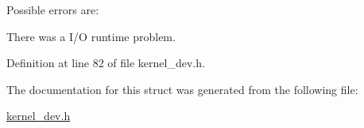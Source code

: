 Possible errors are\+:
\begin{DoxyItemize}
\item There was a I/O runtime problem. 
\end{DoxyItemize}

Definition at line 82 of file kernel\+\_\+dev.\+h.



The documentation for this struct was generated from the following file\+:\begin{DoxyCompactItemize}
\item 
\hyperlink{kernel__dev_8h}{kernel\+\_\+dev.\+h}\end{DoxyCompactItemize}
